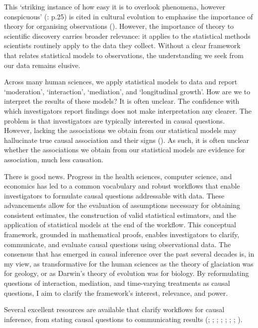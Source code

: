 \documentclass[
  single column]{article}
\begin{document}
This `striking instance of how easy it is to overlook phenomena, however
conspicuous' (: p.25) is
cited in cultural evolution to emphasise the importance of theory for
organising observations (). However, the importance of theory to scientific discovery
carries broader relevance: it applies to the statistical methods
scientists routinely apply to the data they collect. Without a clear
framework that relates statistical models to observations, the
understanding we seek from our data remains elusive.

Across many human sciences, we apply statistical models to data and
report `moderation', `interaction', `mediation', and `longitudinal
growth'. How are we to interpret the results of these models? It is
often unclear. The confidence with which investigators report findings
does not make interpretation any clearer. The problem is that
investigators are typically interested in causal questions. However,
lacking the associations we obtain from our statistical models may
hallucinate true causal association and their signs
(). As such,
it is often unclear whether the associations we obtain from our
statistical models are evidence for association, much less causation.

There is good news. Progress in the health sciences, computer science,
and economics has led to a common vocabulary and robust workflows that
enable investigators to formulate causal questions addressable with
data. These advancements allow for the evaluation of assumptions
necessary for obtaining consistent estimates, the construction of valid
statistical estimators, and the application of statistical models at the
end of the workflow. This conceptual framework, grounded in mathematical
proofs, enables investigators to clarify, communicate, and evaluate
causal questions using observational data. The consensus that has
emerged in causal inference over the past several decades is, in my
view, as transformative for the human sciences as the theory of
glaciation was for geology, or as Darwin's theory of evolution was for
biology. By reformulating questions of interaction, mediation, and
time-varying treatments as causal questions, I aim to clarify the
framework's interest, relevance, and power.

Several excellent resources are available that clarify workflows for
causal inference, from stating causal questions to communicating results
(;
;
;
;
;
;
;
).
\end{document}
